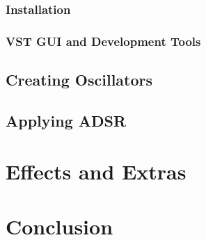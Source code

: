 \documentclass[12pt]{article}
\begin{document}
\subsubsection{Installation}

\subsubsection{VST GUI and Development Tools}

\subsection{Creating Oscillators}

\subsection{Applying ADSR}

\section{Effects and Extras}

\section{Conclusion}




\end{document}
